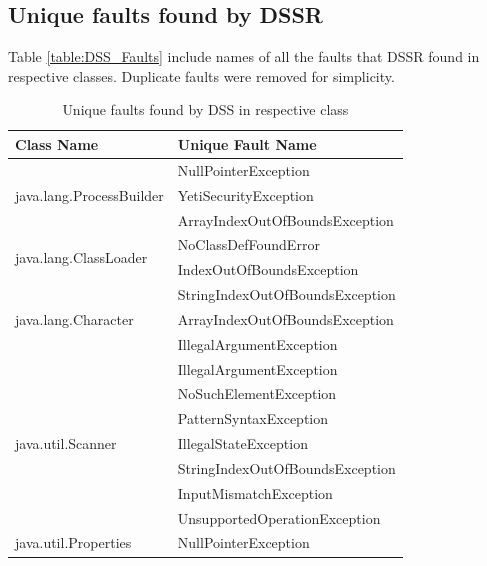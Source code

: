 \documentclass[10pt, conference, compsocconf]{IEEEtran}
\begin{document}
\subsection{Unique faults found by DSSR}
Table \ref{table:DSS_Faults} include names of all the faults that DSSR found in respective classes. Duplicate faults were removed for simplicity.

\begin{table}[ht]
\caption{Unique faults found by DSS in respective class} %
\centering %
\begin{tabular}{| l | l |} %
\hline\hline %
Class Name & Unique Fault Name \\ [0.5ex] %
\hline %
\multirow{3}{*}{java.lang.ProcessBuilder} & NullPointerException\\ %
& YetiSecurityException\\ %
& ArrayIndexOutOfBoundsException\\ %
\hline
\multirow{2}{*}{java.lang.ClassLoader} & NoClassDefFoundError\\ %
& IndexOutOfBoundsException\\ %
\hline
\multirow{3}{*}{java.lang.Character} & StringIndexOutOfBoundsException\\ %
& ArrayIndexOutOfBoundsException\\ %
& IllegalArgumentException\\ %
\hline
\multirow{7}{*}{java.util.Scanner} & IllegalArgumentException\\ %
& NoSuchElementException\\ %
& PatternSyntaxException\\ %
& IllegalStateException\\ %
& StringIndexOutOfBoundsException\\ %
& InputMismatchException\\ %
& UnsupportedOperationException\\ %
\hline
\multirow{2}{*}{java.util.Properties} & NullPointerException\\ %

\end{tabular}
\end{table}
\end{document}
